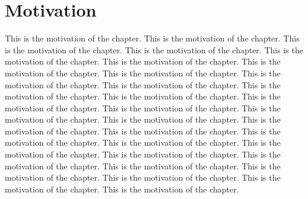 \documentclass{nithreport}
\begin{document}
\chapter{Motivation}
This is the motivation of the chapter. This is the motivation of the chapter. This is the motivation of the chapter. This is the motivation of the chapter. This is the motivation of the chapter. This is the motivation of the chapter. This is the motivation of the chapter. This is the motivation of the chapter. This is the motivation of the chapter. This is the motivation of the chapter. This is the motivation of the chapter. This is the motivation of the chapter. This is the motivation of the chapter. This is the motivation of the chapter. This is the motivation of the chapter. This is the motivation of the chapter. This is the motivation of the chapter. This is the motivation of the chapter. This is the motivation of the chapter. This is the motivation of the chapter. This is the motivation of the chapter. This is the motivation of the chapter. This is the motivation of the chapter. This is the motivation of the chapter. This is the motivation of the chapter. This is the motivation of the chapter. This is the motivation of the chapter. This is the motivation of the chapter. 



\end{document}
